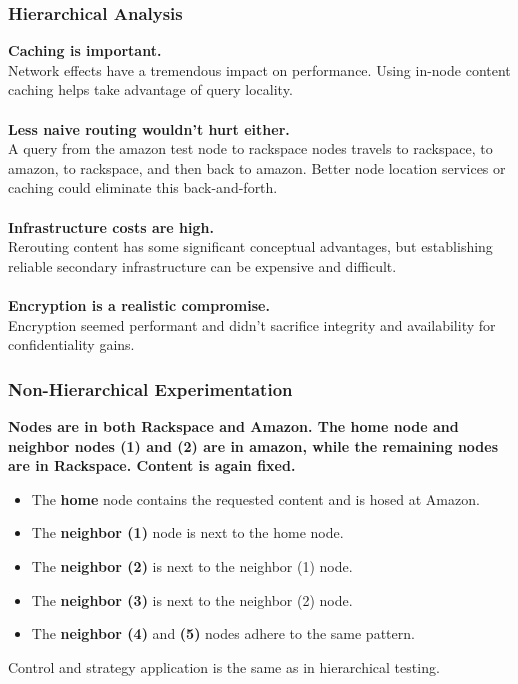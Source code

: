 \documentclass[t,handout]{beamer}
\begin{document}
\begin{frame}
\frametitle{Hierarchical Analysis}
{\bf Caching is important.} \\
{\scriptsize Network effects have a tremendous impact on performance.  Using in-node content caching helps take advantage of query locality.} \\
~\\
{\bf Less naive routing wouldn't hurt either.} \\
{\scriptsize A query from the amazon test node to rackspace nodes travels to rackspace, to amazon, to rackspace, and then back to amazon.  Better node location services or caching could eliminate this back-and-forth.} \\
~\\
{\bf Infrastructure costs are high.} \\
{\scriptsize Rerouting content has some significant conceptual advantages, but establishing reliable secondary infrastructure can be expensive and difficult. } \\
~\\
{\bf Encryption is a realistic compromise.} \\
{\scriptsize Encryption seemed performant and didn't sacrifice integrity and availability for confidentiality gains.}
\end{frame}

\begin{frame}
\frametitle{Non-Hierarchical Experimentation}
{\bf Nodes are in both Rackspace and Amazon.  The home node and neighbor nodes (1) and (2) are in amazon, while the remaining nodes are in Rackspace.  Content is again fixed.}
\begin{small}
\begin{itemize}
\item The {\bf home} node contains the requested content and is hosed at Amazon.
\item The {\bf neighbor (1)} node is next to the home node.
\item The {\bf neighbor (2)} is next to the neighbor (1) node.
\item The {\bf neighbor (3)} is next to the neighbor (2) node.
\item The {\bf neighbor (4)} and {\bf (5)} nodes adhere to the same pattern.
\end{itemize}
\end{small}
Control and strategy application is the same as in hierarchical testing.
\end{frame}
\end{document}

